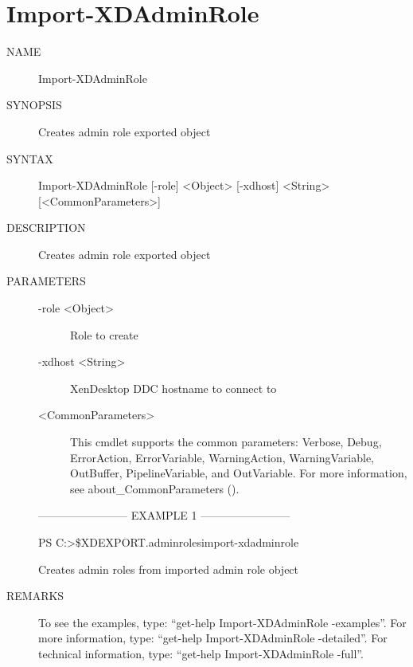 \documentclass[letterpaper,10pt,english]{sphinxmanual}
\begin{document}
\section{Import-XDAdminRole}
\label{\detokenize{cmd_import:import-xdadminrole}}\begin{description}
\item[{NAME}] \leavevmode
Import-XDAdminRole

\item[{SYNOPSIS}] \leavevmode
Creates admin role exported object

\item[{SYNTAX}] \leavevmode
Import-XDAdminRole {[}-role{]} \textless{}Object\textgreater{} {[}-xdhost{]} \textless{}String\textgreater{} {[}\textless{}CommonParameters\textgreater{}{]}

\item[{DESCRIPTION}] \leavevmode
Creates admin role exported object

\item[{PARAMETERS}] \leavevmode\begin{description}
\item[{-role \textless{}Object\textgreater{}}] \leavevmode
Role to create

\item[{-xdhost \textless{}String\textgreater{}}] \leavevmode
XenDesktop DDC hostname to connect to

\item[{\textless{}CommonParameters\textgreater{}}] \leavevmode
This cmdlet supports the common parameters: Verbose, Debug,
ErrorAction, ErrorVariable, WarningAction, WarningVariable,
OutBuffer, PipelineVariable, and OutVariable. For more information, see
about\_CommonParameters ().

\end{description}

————————\textendash{} EXAMPLE 1 ————————\textendash{}

PS C:\textgreater{}\$XDEXPORT.adminroles\textbar{}import-xdadminrole

Creates admin roles from imported admin role object

\item[{REMARKS}] \leavevmode
To see the examples, type: “get-help Import-XDAdminRole -examples”.
For more information, type: “get-help Import-XDAdminRole -detailed”.
For technical information, type: “get-help Import-XDAdminRole -full”.

\end{description}
\end{document}
